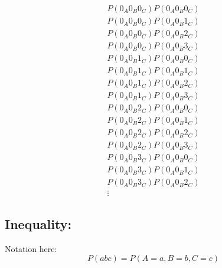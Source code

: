 \documentclass{article}
\begin{document}
    \begin{gather*}
        P(0_A0_B0_C)P(0_A0_B0_C) \\
        P(0_A0_B0_C)P(0_A0_B1_C) \\
        P(0_A0_B0_C)P(0_A0_B2_C) \\
        P(0_A0_B0_C)P(0_A0_B3_C) \\
        P(0_A0_B1_C)P(0_A0_B0_C) \\
        P(0_A0_B1_C)P(0_A0_B1_C) \\
        P(0_A0_B1_C)P(0_A0_B2_C) \\
        P(0_A0_B1_C)P(0_A0_B3_C) \\
        P(0_A0_B2_C)P(0_A0_B0_C) \\
        P(0_A0_B2_C)P(0_A0_B1_C) \\
        P(0_A0_B2_C)P(0_A0_B2_C) \\
        P(0_A0_B2_C)P(0_A0_B3_C) \\
        P(0_A0_B3_C)P(0_A0_B0_C) \\
        P(0_A0_B3_C)P(0_A0_B1_C) \\
        P(0_A0_B3_C)P(0_A0_B2_C) \\
        \vdots
    \end{gather*}

    \subsection*{Inequality:}
    Notation here:
    \[ P(abc) = P(A = a, B = b, C = c) \]
\end{document}
